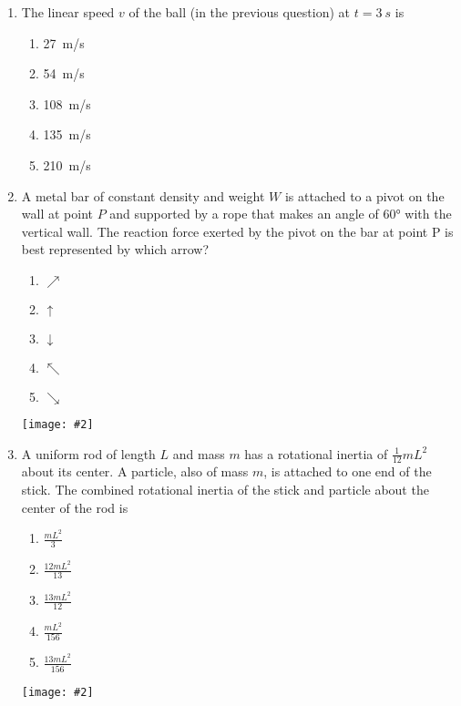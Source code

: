 \documentclass[12pt]{article}
\newcommand{\pic}[2]{\texttt{[image: \#2]}}
\begin{document}
\begin{enumerate}[leftmargin=50pt,label=\underline{\hspace{0.4in}} \arabic*]
\item The linear speed $v$ of the ball (in the previous question) at
  $t=\SI{3}{s}$ is
  \begin{enumerate}[noitemsep,topsep=0pt]
  \item\SI{27 }{m/s}
  \item\SI{54 }{m/s}
  \item\SI{108}{m/s}
  \item\SI{135}{m/s}
  \item\SI{210}{m/s}
  \end{enumerate}

\item A metal bar of constant density and weight $W$ is attached to a pivot on
  the wall at point $P$ and supported by a rope that makes an angle of \ang{60}
  with the vertical wall. The reaction force exerted by the pivot on the
  bar at point P is best represented by which arrow?\\
  \begin{minipage}{0.3\textwidth}
    \begin{enumerate}[noitemsep,topsep=0pt]
    \item $\nearrow$
    \item $\uparrow$
    \item $\downarrow$
    \item $\nwarrow$
    \item $\searrow$
    \end{enumerate}
  \end{minipage}
  \begin{minipage}{0.6\textwidth}
    \pic{.5}{metal-bar.png}
  \end{minipage}

\item A uniform rod of length $L$ and mass $m$ has a rotational inertia of
  $\displaystyle \frac{1}{12}mL^2$ about its center. A particle, also of mass
  $m$, is attached to one end of the stick. The combined rotational inertia of
  the stick and particle about the center of the rod is
  
  \begin{minipage}{0.3\textwidth}
    \begin{enumerate}[noitemsep,topsep=0pt]
    \item$\displaystyle \frac{mL^2}{3}$
    \item$\displaystyle \frac{12mL^2}{13}$
    \item$\displaystyle \frac{13mL^2}{12}$
    \item$\displaystyle \frac{mL^2}{156}$
    \item$\displaystyle \frac{13mL^2}{156}$
    \end{enumerate}
  \end{minipage}
  \begin{minipage}{0.6\textwidth}
    \pic{.8}{I.png}
  \end{minipage}


\end{enumerate}
\end{document}
